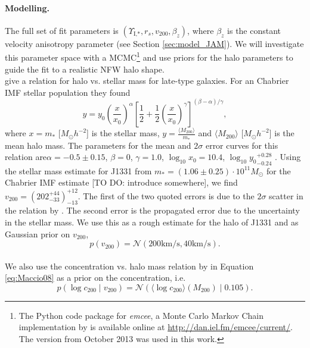 \paragraph{Modelling.} The full set of fit parameters is $(\Upsilon_\text{I,*},r_s,v_{200},\beta_z)$, where $\beta_z$ is the constant velocity anisotropy parameter (see Section \ref{sec:model_JAM}). We will investigate this parameter space with a MCMC\footnote{The Python code package for \emph{emcee}, a Monte Carlo Markov Chain implementation by \citet{emcee} is available online at \url{http://dan.iel.fm/emcee/current/}. The version from October 2013 was used in this work.} \citep{emcee} and use priors for the halo parameters to guide the fit to a realistic NFW halo shape.
\\\citet{Dutton10} give a relation for halo vs. stellar mass for late-type galaxies. For an Chabrier IMF stellar population they found
\begin{equation*}
y = y_0 \left( \frac{x}{x_0} \right)^\alpha \left[ \frac 12 + \frac 12 \left(\frac{x}{x_0} \right)^\gamma \right]^{(\beta - \alpha)/\gamma},
\end{equation*}
where $x= m_*$ [$M_\odot h^{-2}$] is the stellar mass, $y = \frac{\langle M_{200}\rangle}{m_*}$ and $\langle M_{200}\rangle$ [$M_\odot h^{-2}$] is the mean halo mass. The parameters for the mean and $2\sigma$ error curves for this relation are$\alpha = -0.5\pm0.15$, $\beta = 0$, $\gamma = 1.0$, $\log_{10} x_0 = 10.4$, $\log_{10} {y_0}_{-0.24}^{+0.28}$ \citet{Dutton10}. Using the stellar mass estimate for J1331 from \citet{SWELLSI} $m_* = (1.06 \pm 0.25) \cdot 10^{11} M_\odot$ for the Chabrier IMF estimate [TO DO: introduce somewhere], we find ${v_{200}} = (202_{-33}^{+44})_{-13}^{+12}$. The first of the two quoted errors is due to the $2\sigma$ scatter in the relation by \citet{Dutton10}. The second error is the propagated error due to the uncertainty in the stellar mass. We use this as a rough estimate for the halo of J1331 and as Gaussian prior on $v_{200}$, 
\begin{equation*}
p(v_{200}) = \mathscr{N}(200 \text{km/s} ,40 \text{km/s}).
\end{equation*}
\\We also use the concentration vs. halo mass relation by \citet{Maccio08} in Equation \ref{eq:Maccio08} as a prior on the concentration, i.e.
\begin{equation*}
p(\log c_{200} \mid v_{200}) = \mathscr{N}\left(\langle \log c_{200} \rangle (M_{200}) \mid 0.105 \right).
\end{equation*}
